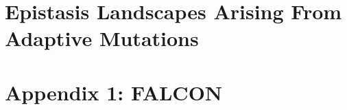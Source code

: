 \documentclass[phd,tocprelim]{cornell}
\newcommand*{\commonDir}{../common/}   %
\begin{document}
\falconAbstractMotivation \falconAbstractResults



\chapter{Epistasis Landscapes Arising From Adaptive Mutations}



\appendix

\chapter{Appendix 1: FALCON}




\end{document}
